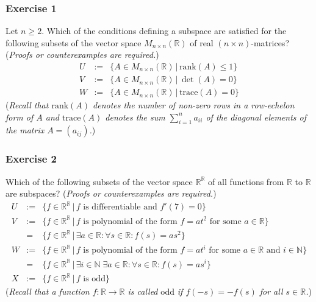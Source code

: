 \documentclass[
  12pt,
  a4paper,
  twoside]{article}
\theoremstyle{plain}
\theoremstyle{definition}
\begin{document}
\hypertarget{exercise-1-4}{%
\subsubsection*{Exercise 1}\label{exercise-1-4}}

Let \(n \ge 2\). Which of the conditions defining a subspace are
satisfied for the following subsets of the vector space
\(M_{n\times n}(\mathbb{R})\) of real \((n\times n)\)-matrices?
(\emph{Proofs or counterexamples are required.})
\begin{eqnarray*}
U& := &\{A \in M_{n \times n}(\mathbb{R})\, | \,\textrm{rank}(A) \le 1\}\\
V& := & \{A \in M_{n \times n}(\mathbb{R})\, | \,\det(A) = 0\}\\
W& := & \{A \in M_{n \times n}(\mathbb{R})\, |\, \textrm{trace}(A) = 0\}
\end{eqnarray*}
(\emph{Recall that \(\textrm{rank}(A)\) denotes the number of non-zero rows in a
row-echelon form of \(A\) and \(\textrm{trace}(A)\) denotes the sum \(\sum_{i=1}^n a_{ii}\) of the diagonal elements of the matrix \(A = (a_{ij})\).})

\hypertarget{exercise-2-4}{%
\subsubsection*{Exercise 2}\label{exercise-2-4}}

Which of the following subsets of the vector space \(\mathbb{R}^{\mathbb{R}}\)
of all functions from \(\mathbb{R}\) to \(\mathbb{R}\) are subspaces?
(\emph{Proofs or counterexamples are required.})
\begin{eqnarray*}
U&:= & \{f \in \mathbb{R}^{\mathbb{R}}\, | \,f \textrm{ is differentiable and } f'(7)=0\}\\
V&:= & \{f \in \mathbb{R}^\mathbb{R} \,|\, f \textrm{ is polynomial of the form } f = at^2 \textrm{ for some } a \in \mathbb{R}\}\\ &= &\{f \in \mathbb{R}^\mathbb{R} \,|\, \exists a \in \mathbb{R} : \forall s \in \mathbb{R} : f(s) = a s^2\}\\
W&:= & \{f \in \mathbb{R}^\mathbb{R} \,| \,f \textrm{ is polynomial of the form } f = a t^i \textrm{ for some } a \in \mathbb{R}\textrm{ and }i\in\mathbb{N}\}\\ & = &\{f \in \mathbb{R}^\mathbb{R}\, | \,\exists i \in \mathbb{N}\; \exists a \in \mathbb{R} : \forall s \in \mathbb{R} : f(s) = a s^i\}\\
X& := & \{f \in \mathbb{R}^\mathbb{R} \,|\, f \textrm{ is odd}\}
\end{eqnarray*}
(\emph{Recall that a function \(f:\mathbb{R} \rightarrow \mathbb{R}\) is called} odd \emph{if \(f(-s) = -f(s)\) for all \(s \in \mathbb{R}\).})
\end{document}
